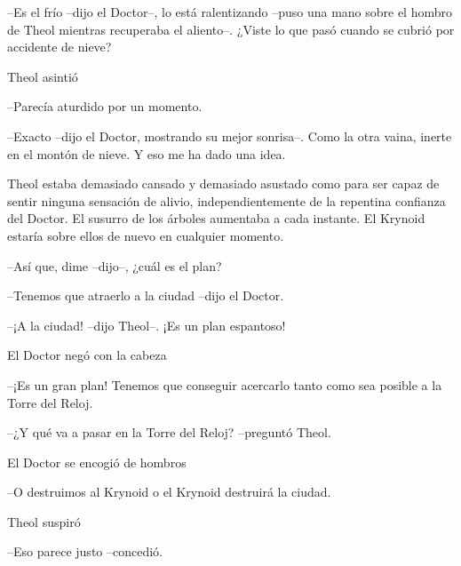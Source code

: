 --Es el frío --dijo el Doctor--, lo está ralentizando --puso una mano sobre el hombro de Theol mientras recuperaba el aliento--. ¿Viste lo que pasó cuando se cubrió por accidente de nieve?



Theol asintió 

--Parecía aturdido por un momento.



--Exacto --dijo el Doctor, mostrando su mejor sonrisa--. Como la otra vaina, inerte en el montón de nieve. Y eso me ha dado una idea.



Theol estaba demasiado cansado y demasiado asustado como para ser capaz de sentir ninguna sensación de alivio, independientemente de la repentina confianza del Doctor. El susurro de los árboles aumentaba a cada instante. El Krynoid estaría sobre ellos de nuevo en cualquier momento.

 --Así que, dime --dijo--, ¿cuál es el plan?



--Tenemos que atraerlo a la ciudad --dijo el Doctor.



--¡A la ciudad! --dijo Theol--. ¡Es un plan espantoso!



El Doctor negó con la cabeza 

--¡Es un gran plan! Tenemos que conseguir acercarlo tanto como sea posible a la Torre del Reloj.



--¿Y qué va a pasar en la Torre del Reloj? --preguntó Theol.



El Doctor se encogió de hombros 

--O destruimos al Krynoid o el Krynoid destruirá la ciudad.



Theol suspiró 

--Eso parece justo --concedió.
